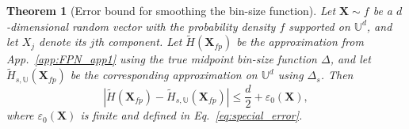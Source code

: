 \documentclass[12pt,onecolumn, margin=1in]{IEEEtran}
\newtheorem{theorem}{Theorem}[section]
\newcommand{\abs}[1]{\left| #1 \right|}
\begin{document}
\begin{theorem}[Error bound for smoothing the bin-size function]\label{thm:steps}
Let $\mathbf{X}\sim f$ be a $d$-dimensional random vector with the probability density $f$ supported on $\mathbb U^d$, and let $X_j$ denote its $j$th component. Let $\tilde H(\mathbf X_{fp})$ be the approximation from App.~\ref{app:FPN_app1} using the true midpoint bin-size function $\Delta$, and let $\tilde H_{s,\mathbb U}(\mathbf X_{fp})$ be the corresponding approximation on $\mathbb U^d$ using $\Delta_s$. Then
\begin{equation}
\abs{\tilde H(\mathbf X_{fp}) - \tilde H_{s,\mathbb U}(\mathbf X_{fp})} \leq \frac{d}{2} + \varepsilon_{0}(\mathbf X),
\end{equation}
where $\varepsilon_{0}(\mathbf X)$ is finite and defined in Eq.~\eqref{eq:special_error}.
\end{theorem}
\end{document}
